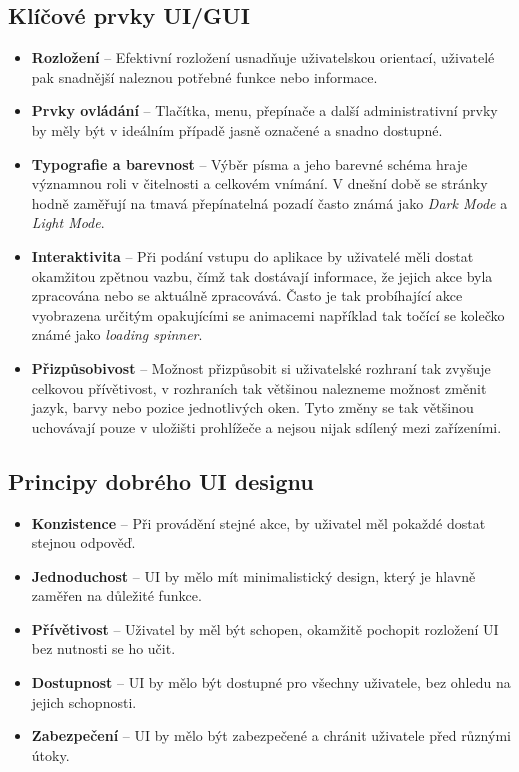 \subsection*{Klíčové prvky UI/GUI}
\label{subsec:ui-gui-theory-key-elements}
\begin{itemize}
    \item \textbf{Rozložení} -- Efektivní rozložení usnadňuje uživatelskou orientací, uživatelé pak snadnější naleznou potřebné funkce nebo informace.
    \item \textbf{Prvky ovládání} -- Tlačítka, menu, přepínače a další administrativní prvky by měly být v ideálním případě jasně označené a snadno dostupné.
    \item \textbf{Typografie a barevnost} -- Výběr písma a jeho barevné schéma hraje významnou roli v čitelnosti a celkovém vnímání. V dnešní době se stránky hodně zaměřují na tmavá přepínatelná pozadí často známá jako \textit{Dark Mode} a \textit{Light Mode}.
    \item \textbf{Interaktivita} -- Při podání vstupu do aplikace by uživatelé měli dostat okamžitou zpětnou vazbu, čímž tak dostávají informace, že jejich akce byla zpracována nebo se aktuálně zpracovává. Často je tak probíhající akce vyobrazena určitým opakujícími se animacemi například tak točící se kolečko známé jako \textit{loading spinner}.
    \item \textbf{Přizpůsobivost} -- Možnost přizpůsobit si uživatelské rozhraní tak zvyšuje celkovou přívětivost, v rozhraních tak většinou nalezneme možnost změnit jazyk, barvy nebo pozice jednotlivých oken. Tyto změny se tak většinou uchovávají pouze v uložišti prohlížeče a nejsou nijak sdílený mezi zařízeními.
\end{itemize}

\subsection*{Principy dobrého UI designu}
\label{subsec:ui-gui-theore-basic-use-case}
\begin{itemize}
    \item \textbf{Konzistence} -- Při provádění stejné akce, by uživatel měl pokaždé dostat stejnou odpověď.
    \item \textbf{Jednoduchost} -- UI by mělo mít minimalistický design, který je hlavně zaměřen na důležité funkce.
    \item \textbf{Přívětivost} -- Uživatel by měl být schopen, okamžitě pochopit rozložení UI bez nutnosti se ho učit.
    \item \textbf{Dostupnost} -- UI by mělo být dostupné pro všechny uživatele, bez ohledu na jejich schopnosti.
    \item \textbf{Zabezpečení} -- UI by mělo být zabezpečené a chránit uživatele před různými útoky.
\end{itemize}

